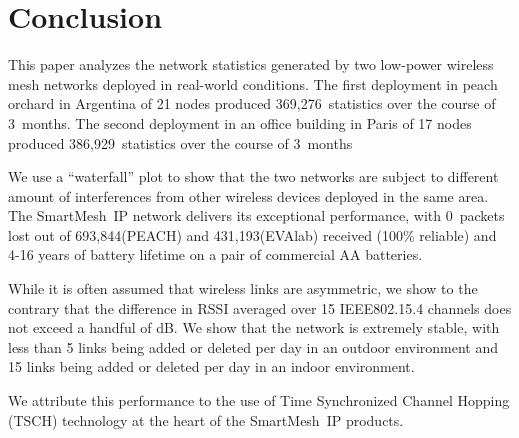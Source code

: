 \documentclass{elsarticle}
\newcommand{\smip}                {SmartMesh~IP\xspace}
\newcommand{\PEACHNUMSTATS}       {369,276\xspace}
\newcommand{\PEACHNUMPCKTS}       {693,844\xspace}
\newcommand{\EVANUMSTATS}         {386,929\xspace}
\newcommand{\EVANUMPCKTS}         {431,193\xspace}
\begin{document}
\section{Conclusion}
\label{sec:conclusion}


This paper analyzes the network statistics generated by two low-power wireless mesh networks deployed in real-world conditions.
The first deployment in peach orchard in Argentina of 21 nodes produced \PEACHNUMSTATS~statistics over the course of 3~months.
The second deployment in an office building in Paris of 17 nodes produced \EVANUMSTATS~statistics over the course of 3~months


We use a ``waterfall'' plot to show that the two networks are subject to different amount of interferences from other wireless devices deployed in the same area.
The \smip network delivers its exceptional performance, with 0~packets lost out of \PEACHNUMPCKTS (PEACH) and \EVANUMPCKTS (EVAlab) received (100\% reliable) and 4-16 years of battery lifetime on a pair of commercial AA batteries.


While it is often assumed that wireless links are asymmetric, we show to the contrary that the difference in RSSI averaged over 15 IEEE802.15.4 channels does not exceed a handful of dB.
We show that the network is extremely stable, with less than 5 links being added or deleted per day in an outdoor environment and 15 links  being added or deleted per day in an indoor environment.


We attribute this performance to the use of Time Synchronized Channel Hopping (TSCH) technology at the heart of the \smip products.

\newpage
%
%
\end{document}
